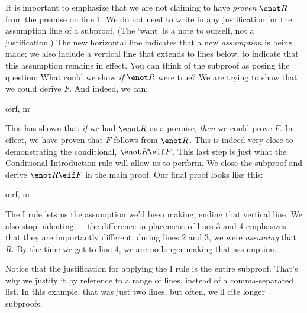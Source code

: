 \begin{ndproof}
	  
	\open
		 
		\have{}{}
	\close
\end{ndproof}

It is important to emphasize that we are not claiming to have \emph{proven} $\enot R$ from the premise on line 1. We do not need to write in any justification for the assumption line of a subproof. (The `want' is a note to ourself, not a justification.) The new horizontal line indicates that a new \emph{assumption} is being made; we also include a vertical line that extends to lines below, to indicate that this assumption remains in effect. You can think of the subproof as posing the question: What could we show \emph{if} $\enot R$ were true? We are trying to show that we could derive $F$. And indeed, we can:

\begin{ndproof}
	  
	\open
		 
		\oe{rf, nr}
	\close
\end{ndproof}

This has shown that \emph{if} we had $\enot R$ as a premise, \emph{then} we could prove $F$. In effect, we have proven that $F$ follows from $\enot R$. This is indeed very close to demonstrating the conditional, $\enot R \eif F$. This last step is just what the Conditional Introduction rule will allow us to perform. We close the subproof and derive $\enot R \eif F$ in the main proof. Our final proof looks like this:

\begin{ndproof}
	\open
		\oe{rf, nr}
	\close
\end{ndproof}

The {\eif}I rule lets us  the assumption we'd been making, ending that vertical line. We also stop indenting --- the difference in placement of lines 3 and 4 emphasizes that they are importantly different: during lines 2 and 3, we were \emph{assuming} that \enot $R$. By the time we get to line 4, we are no longer making that assumption.

Notice that the justification for applying the {\eif}I rule is the entire subproof. That's why we justify it by reference to a range of lines, instead of a comma-separated list. In this example, that was just two lines, but often, we'll cite longer subproofs.


